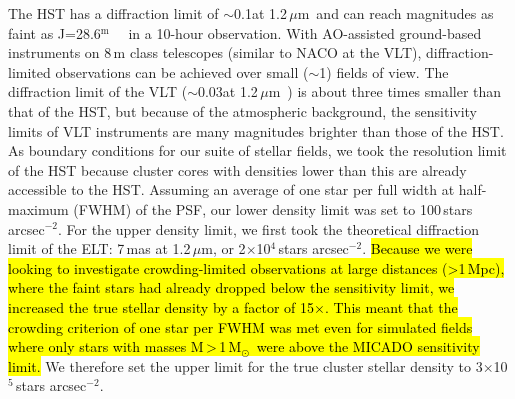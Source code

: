 \documentclass{aa}
\newcommand{\m}{$^\mathrm{m}$~}
\newcommand{\um}{$\mu$m~}
\newcommand{\ume}{$\mu$m}
\newcommand{\msun}{M$_\odot$~}
\newcommand{\s}{$\sim$}
\newcommand{\h}[1]{$^{#1}$}
\newcommand{\spae}{stars arcsec$^{-2}$}
\begin{document}
The HST has a diffraction limit of \s0.1\arcsec at 1.2\,\um and can reach magnitudes as faint as J=28.6\m~\citep{hst_wfc3} in a 10-hour observation.
With AO-assisted ground-based instruments on 8\,m class telescopes (similar to NACO at the VLT), diffraction-limited observations can be achieved over small (\s1\arcmin) fields of view.
The diffraction limit of the VLT (\s0.03\arcsec at 1.2\,\um) is about three times smaller than that of the HST, but because of the atmospheric background, the sensitivity limits of VLT instruments are many magnitudes brighter than those of the HST\@.
As boundary conditions for our suite of stellar fields, we took the resolution limit of the HST because cluster cores with densities lower than this are already accessible to the HST\@.
Assuming an average of one star per full width at half-maximum (FWHM) of the PSF, our lower density limit was set to 100\,\spae.
For the upper density limit, we first took the theoretical diffraction limit of the ELT: 7\,mas at 1.2\,\ume, or 2$\times$10\h4\,\spae.
\hl{Because we were looking to investigate crowding-limited observations at large distances (\textgreater1\,Mpc), where the faint stars had already dropped below the sensitivity limit, we increased the true stellar density by a factor of 15$\times$.
This meant that the crowding criterion of one star per FWHM was met even for simulated fields where only stars with masses M\,\textgreater\,1\,\msun were above the MICADO sensitivity limit.}
We therefore set the upper limit for the true cluster stellar density to 3$\times$10\h5\,\spae.
\end{document}
